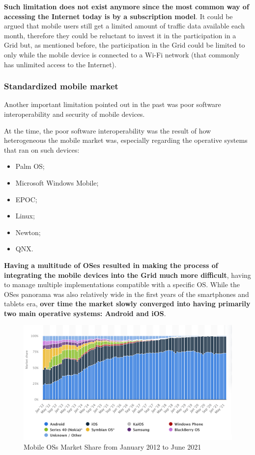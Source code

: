\textbf{Such limitation does not exist anymore since the most common way of accessing the Internet today is by a subscription model}. It could be argued that mobile users still get a limited amount of traffic data available each month, therefore they could be reluctant to invest it in the participation in a Grid but, as mentioned before, the participation in the Grid could be limited to only while the mobile device is connected to a Wi-Fi network (that commonly has unlimited access to the Internet).

\subsubsection{Standardized mobile market}
Another important limitation pointed out in the past was poor software interoperability and security of 
mobile devices.

At the time, the poor software interoperability was the result of how heterogeneous the mobile market was, especially regarding the operative systems that ran on such devices:
\vspace{10mm}
\begin{itemize}
    \item Palm OS;
    \item Microsoft Windows Mobile;
    \item EPOC;
    \item Linux;
    \item Newton;
    \item QNX.
\end{itemize}
\textbf{Having a multitude of OSes resulted in making the process of integrating the mobile devices into the Grid much more difficult}, having to manage multiple implementations compatible with a specific OS. While the OSes panorama was also relatively wide in the first years of the smartphones and tablets era, \textbf{over time the market slowly converged into having primarily two main operative systems: Android and iOS}.

\begin{figure}[!ht]
    \centering
    \includegraphics[scale=0.31]{document/chapters/chapter_1/images/os_market_share_2012_to_2021.png}
    \caption{Mobile OSs Market Share from January 2012 to June 2021 \cite{mobile_and_desktop_os_market}}
    \label{fig:os_market_share_2012_to_2021}
\end{figure}

